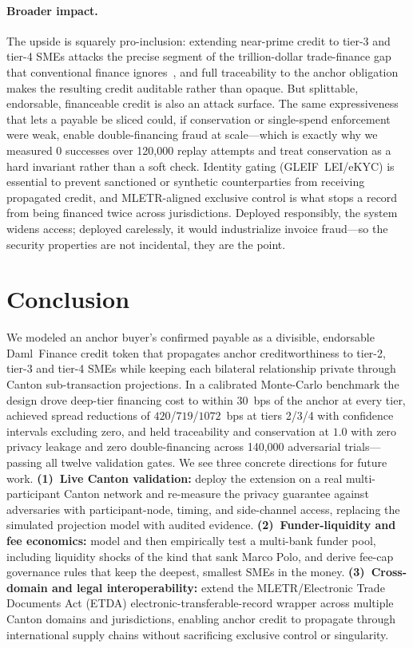 \documentclass[10pt,twocolumn,letterpaper]{article}
\begin{document}
\paragraph{Broader impact.} The upside is squarely pro-inclusion: extending near-prime
credit to tier-3 and tier-4 SMEs attacks the precise segment of the trillion-dollar
trade-finance gap that conventional finance ignores~\cite{adb2021}, and full
traceability to the anchor obligation makes the resulting credit auditable rather than
opaque. But splittable, endorsable, financeable credit is also an attack surface. The
same expressiveness that lets a payable be sliced could, if conservation or
single-spend enforcement were weak, enable double-financing fraud at scale---which is
exactly why we measured $0$ successes over 120{,}000 replay attempts and treat
conservation as a hard invariant rather than a soft check. Identity gating
(GLEIF~LEI/eKYC) is essential to prevent sanctioned or synthetic counterparties from
receiving propagated credit, and MLETR-aligned exclusive control is what stops a
record from being financed twice across jurisdictions. Deployed responsibly, the
system widens access; deployed carelessly, it would industrialize invoice fraud---so
the security properties are not incidental, they are the point.

\section{Conclusion}

We modeled an anchor buyer's confirmed payable as a divisible, endorsable
Daml~Finance credit token that propagates anchor creditworthiness to tier-2, tier-3
and tier-4 SMEs while keeping each bilateral relationship private through Canton
sub-transaction projections. In a calibrated Monte-Carlo benchmark the design drove
deep-tier financing cost to within $30$~bps of the anchor at every tier, achieved
spread reductions of $420$/$719$/$1072$~bps at tiers 2/3/4 with confidence intervals
excluding zero, and held traceability and conservation at $1.0$ with zero privacy
leakage and zero double-financing across 140{,}000 adversarial trials---passing all
twelve validation gates. We see three concrete directions for future work.
\textbf{(1)~Live Canton validation:} deploy the extension on a real multi-participant
Canton network and re-measure the privacy guarantee against adversaries with
participant-node, timing, and side-channel access, replacing the simulated projection
model with audited evidence. \textbf{(2)~Funder-liquidity and fee economics:} model and
then empirically test a multi-bank funder pool, including liquidity shocks of the kind
that sank Marco Polo, and derive fee-cap governance rules that keep the deepest, smallest
SMEs in the money. \textbf{(3)~Cross-domain and legal interoperability:} extend the
MLETR/Electronic Trade Documents Act (ETDA) electronic-transferable-record wrapper across multiple Canton domains and
jurisdictions, enabling anchor credit to propagate through international supply chains
without sacrificing exclusive control or singularity.
\end{document}
